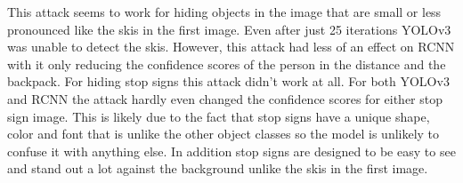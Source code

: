\documentclass{article}
\begin{document}
This attack seems to work for hiding objects in the image that are small or less pronounced like the skis in the first image. Even after just 25 iterations YOLOv3 was unable to detect the skis. However, this attack had less of an effect on RCNN with it only reducing the confidence scores of the person in the distance and the backpack. For hiding stop signs this attack didn't work at all. For both YOLOv3 and RCNN the attack hardly even changed the confidence scores for either stop sign image. This is likely due to the fact that stop signs have a unique shape, color and font that is unlike the other object classes so the model is unlikely to confuse it with anything else. In addition stop signs are designed to be easy to see and stand out a lot against the background unlike the skis in the first image.

\clearpage


\end{document}
